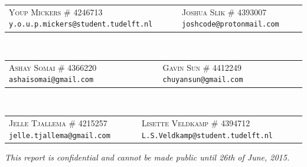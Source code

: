 \begin{titlepage}
\begin{center}
\begin{tabular}{C{7cm} C{7cm}}
	\textsc{Youp Mickers} \newline
		\textsc{\# 4246713} \newline
		\texttt{y.o.u.p.mickers@student.tudelft.nl}	&
	\textsc{Joshua Slik} \newline
		\textsc{\# 4393007} \newline
		\texttt{joshcode@protonmail.com}
\end{tabular}
\\[2mm]
\begin{tabular}{C{7cm} C{7cm}}
	\textsc{Ashay Somai} \newline
		\textsc{\# 4366220} \newline
		\texttt{ashaisomai@gmail.com} &
	\textsc{Gavin Sun} \newline
		\textsc{\# 4412249} \newline
		\texttt{chuyansun@gmail.com}
\end{tabular}
\\[2mm]
\begin{tabular}{C{7cm} C{7cm}}
	\textsc{Jelle Tjallema} \newline
		\textsc{\# 4215257} \newline
		\texttt{jelle.tjallema@gmail.com}	&
	\textsc{Lisette Veldkamp} \newline
		\textsc{\# 4394712} \newline
		\texttt{L.S.Veldkamp@student.tudelft.nl}
\end{tabular}

\vfill

\bigskip
\bigskip
\emph{This report is confidential and cannot be made public until 26th of June, 2015.}

\end{center}

\end{titlepage}

